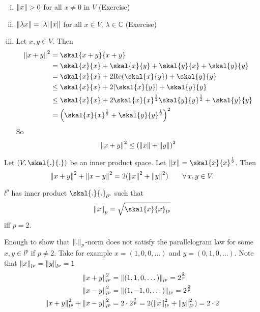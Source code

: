 \begin{beweis}
	\begin{enumerate}[(i)]
		\item $\norm{x} >0$ for all $x \neq 0$ in $V$ (Exercise)
		\item $\norm{\lambda x} = \abs{\lambda} \norm{x}$ for all $x \in V$, $\lambda \in \mathbb{C}$ (Exercise)
		\item Let $x,y \in V$. Then 
		\begin{align*}
			\norm{x+y}^2 &= \skal{x+y}{x+y} \\ &= \skal{x}{x}+ \skal{x}{y}+ \skal{y}{x} + \skal{y}{y} \\
			&= \skal{x}{x} + 2 \text{Re}( \skal{x}{y}) + \skal{y}{y} \\
			&\leq  \skal{x}{x}+ 2 \abs{\skal{x}{y}} + \skal{y}{y} \\
			&\leq  \skal{x}{x} + 2 \skal{x}{x}^{\frac{1}{2}}\skal{y}{y}^{\frac{1}{2}} + \skal{y}{y} \\
			&= \left( \skal{x}{x}^{\frac{1}{2}} + \skal{y}{y}^{\frac{1}{2}} \right)^2 
		\end{align*} 
		So
		\[
			\norm{x+y}^2 \leq \left( \norm{x} + \norm{y} \right)^2
		\]
	\end{enumerate}
\end{beweis}
\begin{theorem}
	Let $(V, \skal{.}{.})$ be an inner product space. Let $\norm{x} = \skal{x}{x}^{\frac{1}{2}}$. Then
	\[
		\norm{x+y}^2 + \norm{x-y}^2 = 2 (\norm{x}^2 + \norm{y}^2) \qquad \forall\, x,y \in V.
	\]
\end{theorem}
\begin{satz}
	$l^p$ has inner product $\skal{.}{.}_{l^p}$ such that
	\[
		\norm{x}_p = \sqrt{\skal{x}{x}_{l^p}}
	\]
	iff $p =2$.
\end{satz}
\begin{beweis}
	Enough to show that $\norm{.}_p$-norm does not satisfy the parallelogram law for some $x,y \in l^p$ if $p \neq 2$. Take for example $x = (1,0,0, \dots)$
	and $y= (0,1,0, \dots)$. Note that $\norm{x}_{l^p} = \norm{y}_{l^p} = 1$
	\begin{align*}
		\norm{x+y}^2_{l^p} &= \norm{(1,1,0, \dots)}_{l^p} = 2^{\frac{2}{p}} \\
		\norm{x-y}^2_{l^p} &= \norm{(1,-1,0,\dots)}_{l^p} = 2^{\frac{2}{p}} \\
		\norm{x+y}^2_{l^p} + \norm{x-y}_{l^p}^2 &= 2 \cdot 2^{\frac{2}{p}} = 2( \norm{x}^2_{l^p}+ \norm{y}^2_{l^p}) = 2 \cdot 2
	\end{align*}
\end{beweis}
